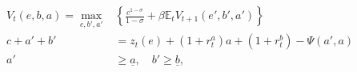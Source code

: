\begin{align} \tag{1}
    V_t(e, b, a) = \max_{c, b', a'} & \left\{\frac{c^{1-\sigma}}{1-\sigma} + \beta \mathbb{E}_t V_{t+1}(e', b', a') \right\}
    \\
    c + a' + b'                     & = z_t(e) + (1 + r_t^a)a + (1 + r_t^b) - \Psi(a', a)
    \\
    a'                              & \geq \underline{a}, \quad b' \geq \underline{b},
\end{align}
